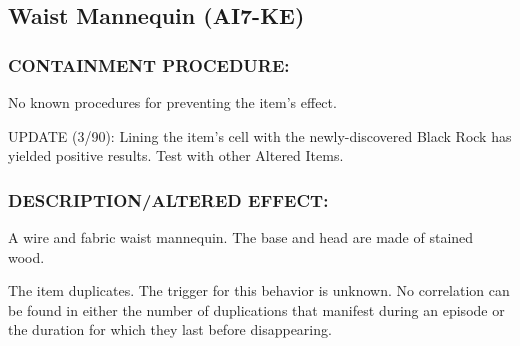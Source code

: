 \subsection*{Waist Mannequin (AI7-KE)}
\subsubsection*{CONTAINMENT PROCEDURE:}
\par No known procedures for preventing the
item's effect.
\par UPDATE (3/90): Lining the item's cell
with the newly-discovered Black Rock
has yielded positive results. Test with
other Altered Items.
\subsubsection*{DESCRIPTION/ALTERED EFFECT:}
\par A wire and fabric waist mannequin. The base and head are made
of stained wood.
\par The item duplicates. The trigger for this behavior is unknown. No
correlation can be found in either the number of duplications that
manifest during an episode or the duration for which they last
before disappearing.